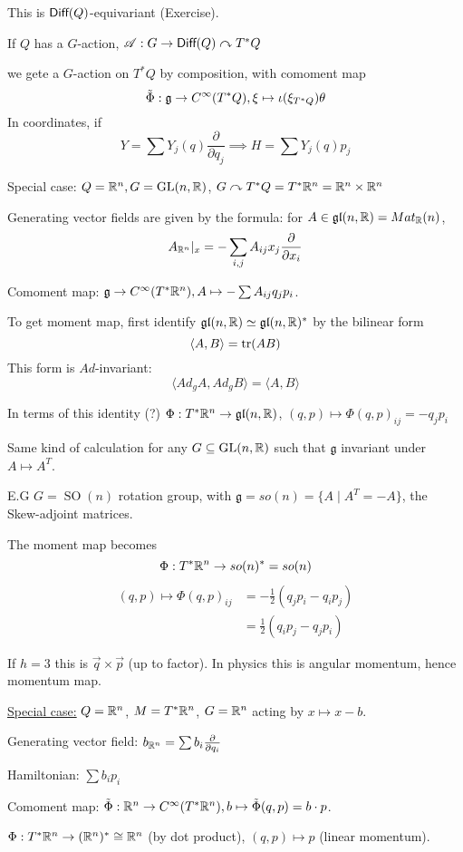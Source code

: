 \documentclass[x11names,reqno,14pt]{extarticle}
\newcommand{\mk}[1]{\mathfrak{#1}}
\newcommand{\g}{\mk{g}}
\DeclareMathOperator{\SO}{SO}
\newcommand{\pp}[2]{\frac{\partial #1}{\partial #2}}
\newcommand{\gl}{\mk{g}\mk{l}}
\begin{document}
This is ${{\text{\sffamily {Diff}}}}(Q)$-equivariant (Exercise). 

If $Q$ has a $G$-action, $\mathscr{A}:G\to{{\text{\sffamily {Diff}}}}(Q) \curvearrowright T^*Q$

we gete a $G$-action on $T^*Q$ by composition, with comoment map
\[
\tilde{\Phi}:\g\to C^\oo(T^*Q), \xi \mapsto \iota(\xi_{T^*Q})\theta
\]
In coordinates, if 
\[
Y = \sum Y_j(q)\pp{}{q_j} \implies H = \sum Y_j(q)p_j
\]

Special case: $Q = \mathbb{R}^n, G = {\mathrm{GL}}(n,\mathbb{R})$, $G\curvearrowright T^*Q = T^*\mathbb{R}^n = \mathbb{R}^n\times\mathbb{R}^n$

Generating vector fields are given by the formula: for $A \in \gl(n,\R) = Mat_{\R}(n)$, 
\[
A_{\R^n}|_{x} = -\sum_{i,j}A_{ij}x_j\pp{}{x_i}
\]

Comoment map: $\g\to C^\oo(T^*\R^n), A \mapsto - \sum A_{ij}q_jp_i$. 

To get moment map, first identify $\gl(n,\R) \simeq \gl(n,\R)^*$ by the bilinear form 
\[
\langle A, B\rangle = \operatorname{\mathrm{tr}}(AB)
\]
This form is $Ad$-invariant:
\[
\langle Ad_g A, Ad_gB \rangle = \langle A, B \rangle
\]

In terms of this identity (?) 
$\Phi:T^*\R^n\to\gl(n,\R)$, $(q, p) \mapsto \Phi(q,p)_{ij} = -q_jp_i$

Same kind of calculation for any $G \subseteq {\mathrm{GL}}(n,\mathbb{R})$ such that $\g$ invariant under $A \mapsto A^T$.

E.G $G = \SO(n)$ rotation group, with $\g = so(n) = \{A \mid A^T = -A\}$, the Skew-adjoint matrices.

The moment map becomes
\[
\Phi:T^*\mathbb{R}^n \to so(n)^* =so(n)
\]
\begin{align*}
(q,p) \mapsto \Phi(q,p)_{ij} & =-\frac12(q_jp_i - q_ip_j) \\
& = \frac12(q_ip_j - q_jp_i)
\end{align*}

If $h = 3$ this is $\vec{q}\times\vec{p}$ (up to factor). In physics this is angular momentum, hence momentum map.

\exm

\underline{Special case:} $Q = \mathbb{R}^n$, $M = T^*\mathbb{R}^n$, $G = \mathbb{R}^n$ acting by $x \mapsto x - b$.

Generating vector field: $b_{\R^n} = \sum b_i\pp{}{q_i}$ 

Hamiltonian: $\sum b_ip_i$

Comoment map: $\tilde{\Phi}:\mathbb{R}^n\to C^\infty(T^*\mathbb{R}^n), b \mapsto \tilde{\Phi}(q,p) = b\cdot p$. 

$\Phi:T^*\mathbb{R}^n \to (\mathbb{R}^n)^* \cong \mathbb{R}^n$ (by dot product), $(q, p) \mapsto p$ (linear momentum). 
\end{document}
